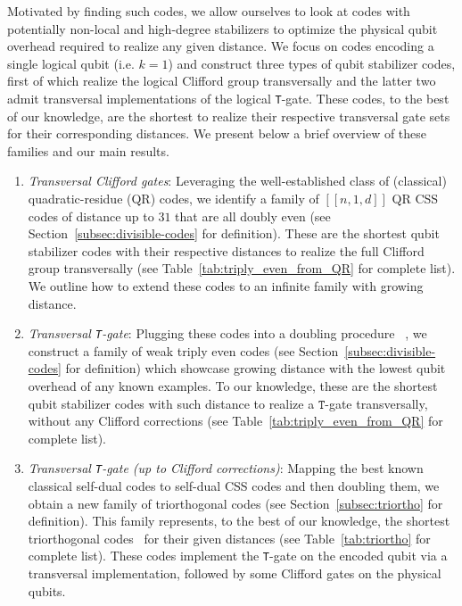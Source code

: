 \documentclass[journal]{IEEEtran}
\newcommand{\T}{\texttt{T}}
\begin{document}
Motivated by finding such codes, we allow ourselves to look at codes with potentially non-local and high-degree stabilizers to optimize the physical qubit overhead required to realize any given distance. We focus on codes encoding a single logical qubit (i.e. $k=1$) and construct three types of qubit stabilizer codes, first of which realize the logical Clifford group transversally and the latter two admit transversal implementations of the logical \T-gate. These codes, to the best of our knowledge, are the shortest to realize their respective transversal gate sets for their corresponding distances. We present below a brief overview of these families and our main results.
\begin{enumerate}
    \item \textit{Transversal Clifford gates}: Leveraging the well-established class of (classical) quadratic-residue (QR) codes, we identify a family of \([[n,1,d]]\) QR CSS codes of distance up to \(31\) that are all doubly even (see Section~\ref{subsec:divisible-codes} for definition). These are the shortest qubit stabilizer codes with their respective distances to realize the full Clifford group transversally (see Table~\ref{tab:triply_even_from_QR} for complete list).
    We outline how to extend these codes to an infinite family with growing distance.

    \item \textit{Transversal \T-gate}: Plugging these codes into a doubling procedure ~\cite{betsumiya_triply_2012,bravyi_doubled_2015,haah_towers_2018}, we construct a family of weak triply even codes (see Section~\ref{subsec:divisible-codes} for definition) which showcase growing distance with the lowest qubit overhead of any known examples.
    To our knowledge, these are the shortest qubit stabilizer codes with such distance to realize a \(\texttt T\)-gate transversally, without any Clifford corrections (see Table~\ref{tab:triply_even_from_QR} for complete list).
    
    \item \textit{Transversal \T-gate (up to Clifford corrections)}:
    Mapping the best known classical self-dual codes to self-dual CSS codes and then doubling them, we obtain a new family of triorthogonal codes (see Section~\ref{subsec:triortho} for definition). This family represents, to the best of our knowledge, the shortest triorthogonal codes~\cite{bravyi_magic-state_2012,haah_towers_2018,nezami_classification_2022} for their given distances (see Table~\ref{tab:triortho} for complete list). These codes implement the \T-gate on the encoded qubit via a transversal implementation, followed by some Clifford gates on the physical qubits.

\end{enumerate}
\end{document}
